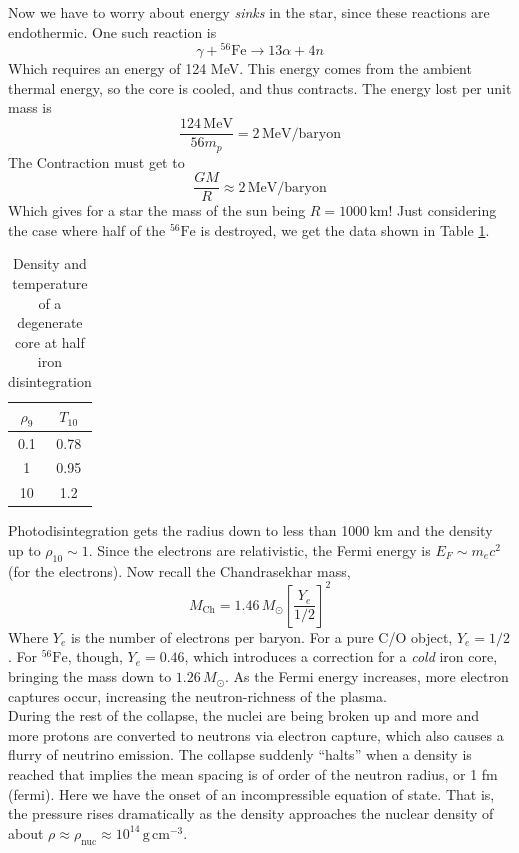 \documentclass[10pt]{article}
\numberwithin{equation}{section}
\newcommand{\n}{\noindent}
\begin{document}
	\n Now we have to worry about energy \emph{sinks} in the star, since these reactions are endothermic. One such reaction is
	\begin{equation}
	\label{eq:367} \gamma+{}^{56}\mathrm{Fe}\to 13\alpha+4n
	\end{equation}
	Which requires an energy of 124 MeV. This energy comes from the ambient thermal energy, so the core is cooled, and thus contracts. The energy lost per unit mass is
	\begin{equation}
	\label{eq:368} \frac{124\,\mathrm{MeV}}{56m_{p}}=2\,\mathrm{MeV/baryon}
	\end{equation}
	The Contraction must get to
	\begin{equation}
	\frac{GM}{R}\approx 2\,\mathrm{MeV/baryon}
	\end{equation}
	Which gives for a star the mass of the sun being $R=1000\,\mathrm{km}$! Just considering the case where half of the ${}^{56}\mathrm{Fe}$ is destroyed, we get the data shown in Table \ref{tab:iron}.\\
	\begin{table}[h!]
	\centering
	\begin{tabular}{cc}
		$\rho_{9}$ & $T_{10}$\\
		\hline \hline
		0.1 & 0.78\\
		1 & 0.95\\
		10 & 1.2
	\end{tabular}
	\caption{Density and temperature of a degenerate core at half iron disintegration}
	\label{tab:iron}
	\end{table}
	
	\n Photodisintegration gets the radius down to less than 1000 km and the density up to $\rho_{10}\sim 1$. Since the electrons are relativistic, the Fermi energy is $E_{F}\sim m_{e}c^{2}$ (for the electrons). Now recall the Chandrasekhar mass,
	\begin{equation}
	\label{eq:369} M_{\mathrm{Ch}}=1.46\,M_{\odot}\left[\frac{Y_{e}}{1/2}\right]^{2}
	\end{equation}
	Where $Y_{e}$ is the number of electrons per baryon. For a pure C/O object, $Y_{e}=1/2$. For ${}^{56}\mathrm{Fe}$, though, $Y_{e}=0.46$, which introduces a correction for a \emph{cold} iron core, bringing the mass down to $1.26\,M_{\odot}$. As the Fermi energy increases, more electron captures occur, increasing the neutron-richness of the plasma.\\
	
	\n During the rest of the collapse, the nuclei are being broken up and more and more protons are converted to neutrons via electron capture, which also causes a flurry of neutrino emission. The collapse suddenly ``halts'' when a density is reached that implies the mean spacing is of order of the neutron radius, or 1 fm (fermi). Here we have the onset of an incompressible equation of state. That is, the pressure rises dramatically as the density approaches the nuclear density of about $\rho\approx \rho_{\mathrm{nuc}}\approx 10^{14}\,\mathrm{g\,cm^{-3}}$.\\
	
\end{document}
